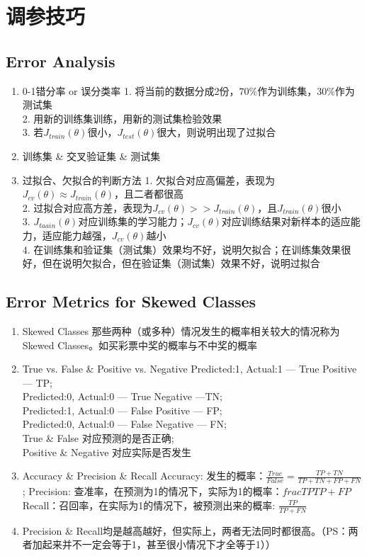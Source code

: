\section{调参技巧}

\subsection{Error Analysis}
\begin{enumerate}
	\item 0-1错分率 or 误分类率
	1. 将当前的数据分成2份，$70\%$作为训练集，$30\%$作为测试集\\
	2. 用新的训练集训练，用新的测试集检验效果\\
	3. 若$J_{train}(\theta)$很小，$J_{test}(\theta)$很大，则说明出现了过拟合
	\item 训练集 \& 交叉验证集 \& 测试集
	\item 过拟合、欠拟合的判断方法
	1. 欠拟合对应高偏差，表现为$J_{cv}(\theta) \approx J_{train}(\theta)$，且二者都很高 \\
	2. 过拟合对应高方差，表现为$J_{cv}(\theta) >> J_{train}(\theta)$，且$J_{train}(\theta)$很小 \\
	3. $J_{taain}(\theta)$对应训练集的学习能力；$J_{cv}(\theta)$对应训练结果对新样本的适应能力，适应能力越强，$J_{cv}(\theta)$越小 \\
	4. 在训练集和验证集（测试集）效果均不好，说明欠拟合；在训练集效果很好，但在说明欠拟合，但在验证集（测试集）效果不好，说明过拟合
\end{enumerate}

\subsection{Error Metrics for Skewed Classes}
\begin{enumerate}
	\item Skewed Classes
	那些两种（或多种）情况发生的概率相关较大的情况称为Skewed Classes。如买彩票中奖的概率与不中奖的概率
	\item True vs. False \& Positive vs. Negative
	Predicted:1, Actual:1 --- True Positive --- TP; \\
	Predicted:0, Actual:0 --- True Negative ---TN; \\
	Predicted:1, Actual:0 --- False Positive --- FP; \\
	Predicted:0, Actual:0 --- False Negative --- FN; \\
	True \& False 对应预测的是否正确; \\
	Positive \& Negative 对应实际是否发生
	\item Accuracy \& Precision \& Recall
	Accuracy: 发生的概率：$\frac{True}{False} = \frac{TP+TN}{TP+TN+FP+FN}$; 
	Precision: 查准率，在预测为1的情况下，实际为1的概率：$frac{TP}{TP+FP}$ \\
	Recall：召回率，在实际为1的情况下，被预测出来的概率: $\frac{TP}{TP+FN}$
	\item Precision \& Recall均是越高越好，但实际上，两者无法同时都很高。（PS：两者加起来并不一定会等于1，甚至很小情况下才全等于1））
\end{enumerate}

